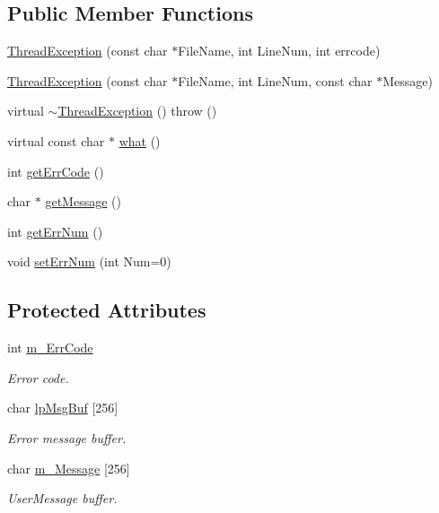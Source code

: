 \subsection*{Public Member Functions}
\begin{DoxyCompactItemize}
\item 
\hyperlink{classThreadException_a6367b52f02d9b964073474e2a4bf065a}{Thread\+Exception} (const char $\ast$File\+Name, int Line\+Num, int errcode)
\item 
\hyperlink{classThreadException_a8e2fd5fddc16b2ef79f9ff9152e07bae}{Thread\+Exception} (const char $\ast$File\+Name, int Line\+Num, const char $\ast$Message)
\item 
virtual \hyperlink{classThreadException_a2b6c29bbca2d87808a573530f9bf354c}{$\sim$\+Thread\+Exception} ()  throw ()
\item 
virtual const char $\ast$ \hyperlink{classThreadException_a3b8dcf8e441a9cba0539ca2455087e57}{what} ()
\item 
int \hyperlink{classThreadException_adb548dbb352870603d20921ffe5d2535}{get\+Err\+Code} ()
\item 
char $\ast$ \hyperlink{classThreadException_a49a3a8d894925c4f76b0ec3338354006}{get\+Message} ()
\item 
int \hyperlink{classThreadException_a03564289d24e7d5246bf43fbcae2f7f3}{get\+Err\+Num} ()
\item 
void \hyperlink{classThreadException_adaa1940a2b6fa8beff808bee9b9fa2cf}{set\+Err\+Num} (int Num=0)
\end{DoxyCompactItemize}
\subsection*{Protected Attributes}
\begin{DoxyCompactItemize}
\item 
int \hyperlink{classThreadException_af35c621f09ff63e9928a8ad5ce596d34}{m\+\_\+\+Err\+Code}
\begin{DoxyCompactList}\small\item\em Error code. \end{DoxyCompactList}\item 
char \hyperlink{classThreadException_a7687b9835112b0381c09ac0b52637be1}{lp\+Msg\+Buf} \mbox{[}256\mbox{]}
\begin{DoxyCompactList}\small\item\em Error message buffer. \end{DoxyCompactList}\item 
char \hyperlink{classThreadException_aa2ab3078b7211738d8eeb1e9e4e2a8cb}{m\+\_\+\+Message} \mbox{[}256\mbox{]}
\begin{DoxyCompactList}\small\item\em User\+Message buffer. \end{DoxyCompactList}\end{DoxyCompactItemize}


